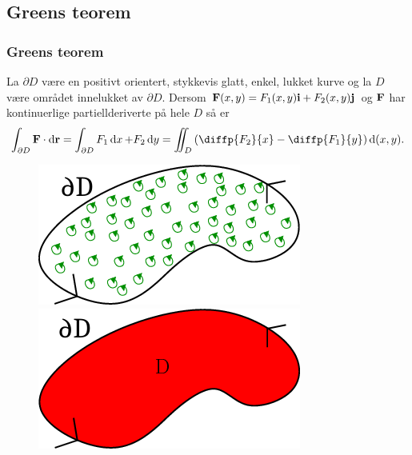 \begin{frame}
    \subsection{Greens teorem}\label{subsec:Greens-teorem}
  \frametitle{Greens teorem}
  \begin{theorem}
    La $\partial D$ være en positivt orientert, stykkevis glatt, enkel, lukket
    kurve og la $D$ være området innelukket av $\partial D$. Dersom $\mathbf{F}(x,y) = F_1(x,y)\mathbf{i} +
    F_2(x,y)\mathbf{j}$ og $\mathbf{F}$ har kontinuerlige partiellderiverte på hele $D$ så er
    \begin{equation*}
      \int_{\partial D} \F \cdot \dr
      = \int_{\partial D} F_1 \dx + F_2 \dy
      = \iint_D \left( \diffp{{F_2}}{x} - \diffp{{F_1}}{y} \right) \dd (x,y).
    \end{equation*}
  \end{theorem}
  \begin{figure}
  \centering
  \begin{minipage}{.45\textwidth}
    \centering
  \includegraphics[width=\linewidth]{../img/greens-1.png}
\end{minipage}
\begin{minipage}{.45\textwidth}
    \centering
  \includegraphics[width=\linewidth]{../img/greens-2.png}
\end{minipage}
\end{figure}

\end{frame}

